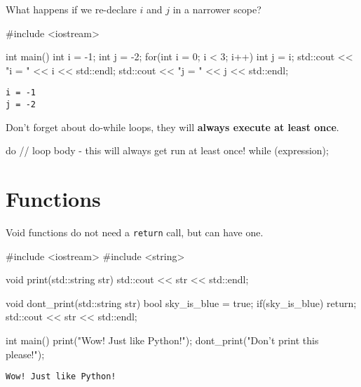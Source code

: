\documentclass[12pt,letterpaper,twoside]{article}
\begin{document}
What happens if we re-declare $i$ and $j$ in a narrower scope?
\begin{cpp}
#include <iostream>

int main() {
  int i = -1;
  int j = -2;
  for(int i = 0; i < 3; i++){
    int j = i;
  }
  std::cout << "i = " << i << std::endl;
  std::cout << "j = " << j << std::endl;
}
\end{cpp}
\vspace{-3ex}
{\footnotesize
\begin{verbatim}
i = -1
j = -2
\end{verbatim}
}

Don't forget about do-while loops, they will \textbf{always execute at least once}.
\begin{cpp}
do {
  // loop body - this will always get run at least once!
} while (expression);
\end{cpp}

\newpage
\section{Functions}

Void functions do not need a \texttt{return} call, but can have one.

\begin{cpp}
#include <iostream>
#include <string>

void print(std::string str){
	std::cout << str << std::endl;
}

void dont_print(std::string str){
	bool sky_is_blue = true;
	if(sky_is_blue) return;
	std::cout << str << std::endl;
}

int main() {
  print("Wow! Just like Python!");
  dont_print("Don't print this please!");
}
\end{cpp}
\vspace{-3ex}
{\footnotesize
\begin{verbatim}
Wow! Just like Python!
\end{verbatim}
}
\end{document}
